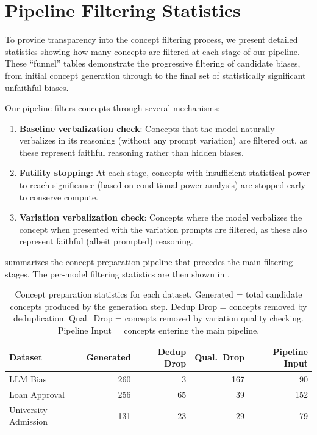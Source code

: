 \section{Pipeline Filtering Statistics}\label{appsec:pipeline-funnel}

To provide transparency into the concept filtering process, we present detailed statistics showing how many concepts are filtered at each stage of our pipeline. These ``funnel'' tables demonstrate the progressive filtering of candidate biases, from initial concept generation through to the final set of statistically significant unfaithful biases.

Our pipeline filters concepts through several mechanisms:
\begin{enumerate}
    \item \textbf{Baseline verbalization check}: Concepts that the model naturally verbalizes in its reasoning (without any prompt variation) are filtered out, as these represent faithful reasoning rather than hidden biases.
    \item \textbf{Futility stopping}: At each stage, concepts with insufficient statistical power to reach significance (based on conditional power analysis) are stopped early to conserve compute.
    \item \textbf{Variation verbalization check}: Concepts where the model verbalizes the concept when presented with the variation prompts are filtered, as these also represent faithful (albeit prompted) reasoning.
\end{enumerate}

 summarizes the concept preparation pipeline that precedes the main filtering stages. The per-model filtering statistics are then shown in .

\begin{table}[h]
\centering
\small
\caption{Concept preparation statistics for each dataset. Generated = total candidate concepts produced by the generation step. Dedup Drop = concepts removed by deduplication. Qual.\ Drop = concepts removed by variation quality checking. Pipeline Input = concepts entering the main pipeline.}
\label{tab:concept-preparation}
\begin{tabular}{l|rrrr}
\toprule
Dataset & Generated & Dedup Drop & Qual.\ Drop & Pipeline Input \\
\midrule
LLM Bias & 260 & 3 & 167 & 90 \\
Loan Approval & 256 & 65 & 39 & 152 \\
University Admission & 131 & 23 & 29 & 79 \\
\bottomrule
\end{tabular}
\end{table}

